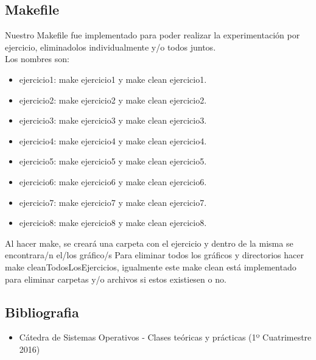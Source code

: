 
\subsection{Makefile}

Nuestro Makefile fue implementado para poder realizar la experimentaci\'on por ejercicio, eliminadolos individualmente y/o todos juntos.\\
Los nombres son:\\
\begin{itemize}
 \item ejercicio1: make ejercicio1 y make clean ejercicio1.
 \item ejercicio2: make ejercicio2 y make clean ejercicio2.
 \item ejercicio3: make ejercicio3 y make clean ejercicio3.
 \item ejercicio4: make ejercicio4 y make clean ejercicio4.
 \item ejercicio5: make ejercicio5 y make clean ejercicio5.
 \item ejercicio6: make ejercicio6 y make clean ejercicio6.
 \item ejercicio7: make ejercicio7 y make clean ejercicio7.
 \item ejercicio8: make ejercicio8 y make clean ejercicio8.
\end{itemize}

Al hacer make, se crear\'a una carpeta con el ejercicio y dentro de la misma se encontrara/n el/los gr\'afico/s
Para eliminar todos los gr\'aficos y directorios hacer make cleanTodosLosEjercicios, igualmente este make clean est\'a implementado
para eliminar carpetas y/o archivos si estos existiesen o no.\\

\subsection{Bibliografia}

\begin{itemize}
 \item C\'atedra de Sistemas Operativos - Clases te\'oricas y pr\'acticas (1º Cuatrimestre 2016)
 \end{itemize}